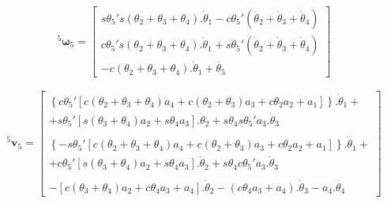 \begin{equation}
    ^5\boldsymbol{\omega}_5 = \begin{bmatrix}
                    s\theta_5's(\theta_2+\theta_3+\theta_4).\dot{\theta}_1 - c\theta_5'(\dot{\theta}_2 + \dot{\theta}_3 + \dot{\theta}_4) \\
                    c\theta_5's(\theta_2+\theta_3+\theta_4).\dot{\theta}_1 + s\theta_5'(\dot{\theta}_2 + \dot{\theta}_3 + \dot{\theta}_4) \\ 
                    -c(\theta_2+\theta_3+\theta_4).\dot{\theta}_1 + \dot{\theta_5}
                \end{bmatrix}
\end{equation}

\begin{equation}
    \begin{gathered}
        ^5\textbf{v}_5 = \begin{bmatrix}
            \left\{c\theta_5'[c(\theta_2 + \theta_3 + \theta_4)a_4 + c(\theta_2 + \theta_3)a_3 + c\theta_2a_2 + a_1]\right\}.\dot{\theta}_1 + \\
            + s\theta_5'[s(\theta_3+\theta_4)a_2 + s\theta_4a_3].\dot{\theta}_2 + s\theta_4s\theta_5'a_3.\dot{\theta}_3 \\ 
            \\
            \left\{-s\theta_5'[c(\theta_2 + \theta_3 + \theta_4)a_4 + c(\theta_2 + \theta_3)a_3 + c\theta_2a_2 + a_1]\right\}.\dot{\theta}_1 + \\
            + c\theta_5'[s(\theta_3+\theta_4)a_2 + s\theta_4a_3].\dot{\theta}_2 + s\theta_4c\theta_5'a_3.\dot{\theta}_3 \\ 
            \\
            -[c(\theta_3+\theta_4)a_2 + c\theta_4a_3 + a_4].\dot{\theta}_2 - (c\theta_4a_3 + a_4).\dot{\theta}_3 - a_4.\dot{\theta_4}
        \end{bmatrix}
    \end{gathered}
\end{equation}


